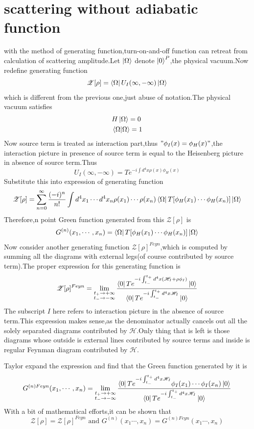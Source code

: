 \documentclass[a4paper]{article}
\begin{document}
\section{scattering without adiabatic function }
with the method of generating function,turn-on-and-off function can retreat from calculation of scattering amplitude.Let  $\ket{\Omega}$ denote $\ket{0}^P$,the physical vacuum.Now redefine generating function$$\mathscr{Z}[\rho]=\bra{\Omega}U_{I}(\infty,-\infty)\ket{\Omega}$$which is different from the previous one,just abuse of notation.The physical vacuum satisfies
\begin{align*}
	&H\ket{\Omega}=0\\
	&\braket{\Omega|\Omega}=1
\end{align*}
Now source term is treated as interaction part,thus $"\phi_I(x)=\phi_H(x)"$,the interaction picture in presence of source term is equal to the Heisenberg picture in absence of source term.Thus$$U_I(\infty,-\infty)=Te^{-i\int d^4x\rho(x)\phi_H(x)}$$Substitute this into  expression of generating function$$\mathscr{Z}[\rho]=\sum_{n=0}^{\infty}\frac{(-i)^n}{n!}\int d^4x_1\cdots d^4x_n\rho(x_1)\cdots\rho(x_n)\bra{\Omega}T[\phi_H(x_1)\cdots\phi_H(x_n)]\ket{\Omega}$$Therefore,n point Green function generated from this $\mathscr{Z}[\rho]$ is$$G^{(n)}(x_1,\cdots,x_n)=\bra{\Omega}T[\phi_H(x_1)\cdots\phi_H(x_n)]\ket{\Omega}$$
Now consider another generating function $\mathscr{Z}[\rho]^{Feyn}$,which is computed by summing all the diagrams with external legs(of course contributed by source term).The proper expression for this generating function is$$\mathscr{Z}[\rho]^{Feyn}=\lim_{\substack{t_+\rightarrow+\infty \\ t_-\rightarrow-\infty}}\frac{\bra{0}Te^{-i\int_{t_-}^{t_+}d^4x(\mathscr{H}_I+\rho\phi_I)}\ket{0}}{\bra{0}Te^{-i\int_{t_-}^{t_+}d^4x\mathscr{H}_I}\ket{0}}$$
The subscript $I$ here refers to interaction picture in the absence of source term.This expression makes sense,as the denominator actually cancels out all the solely separated diagrams contributed by $\mathscr{H}$.Only thing that is left is those diagrams whose outside is external lines contributed by source terms and inside is regular Feynman diagram contributed by $\mathscr{H}$.
\par Taylor expand the expression and find that the Green function generated by it is$$G^{(n)Feyn}(x_1,\cdots,x_n)=\lim_{\substack{t_+\rightarrow+\infty \\ t_-\rightarrow-\infty}}\frac{\bra{0}Te^{-i\int_{t_-}^{t_+}d^4x\mathscr{H}_I}\phi_I(x_1)\cdots\phi_I(x_n)\ket{0}}{\bra{0}Te^{-i\int_{t_-}^{t_+}d^4x\mathscr{H}_I}\ket{0}}$$With a bit of mathematical efforts,it can be shown that$$\mathscr{Z}[\rho]=\mathscr{Z}[\rho]^{Feyn} \text{ and } G^{(n)}(x_1\cdots,x_n)=G^{(n)Feyn}(x_1\cdots,x_n)$$
\end{document}
